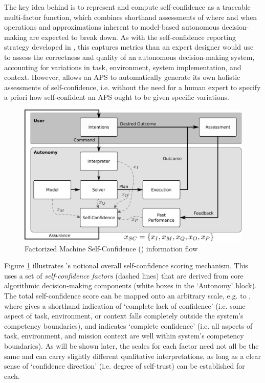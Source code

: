     The key idea behind \famsec{} is to represent and compute self-confidence as a traceable multi-factor function, which combines shorthand assessments of where and when operations and approximations inherent to model-based autonomous decision-making are expected to break down. As with the self-confidence reporting strategy developed in \cite{Hutchins2015-if}, this captures metrics than an expert designer would use to assess the correctness and quality of an autonomous decision-making system, accounting for variations in task, environment, system implementation, and context. However, \famsec{} allows an APS to automatically generate its own holistic assessments of self-confidence, i.e. without the need for a human expert to specify a priori how self-confident an APS ought to be given specific variations. %
    
    
        \begin{figure}[tbp]
        \centering
        \includegraphics[width=0.6\linewidth]{Figures/FaMSeC.png}
        \caption{Factorized Machine Self-Confidence (\famsec) information flow}
        \label{fig:famsec}
    \end{figure}
    
    Figure \ref{fig:famsec} illustrates \famsec's notional overall self-confidence scoring mechanism. This uses a set of \emph{self-confidence factors} (dashed lines) that are derived from core algorithmic decision-making components (white boxes in the `Autonomy' block). The total self-confidence score can be mapped onto an arbitrary scale, e.g. \flow{} to \fup, where \flow{} gives a shorthand indication of `complete lack of confidence' (i.e. some aspect of task, environment, or context falls completely outside the system's competency boundaries), and \fup{} indicates `complete confidence' (i.e. all aspects of task, environment, and mission context are well within system's competency boundaries). As will be shown later, the scales for each factor need not all be the same and can carry slightly different qualitative interpretations, as long as a clear sense of `confidence direction' (i.e. degree of self-trust) can be established for each.
    
